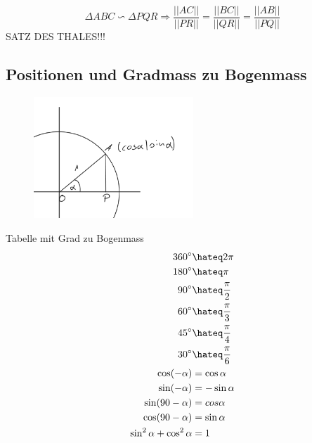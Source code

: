 \documentclass[a4paper,onecolumn,pdftex]{report}
\begin{document}
    \vspace{20px}
    $$\Delta ABC \backsim \Delta PQR \Rightarrow \frac{||AC||}{||PR||}=\frac{||BC||}{||QR||}=\frac{||AB||}{||PQ||}$$
    SATZ DES THALES!!!

    \vspace{20px}
    \subsection*{Positionen und Gradmass zu Bogenmass}
    \begin{figure}
        \includegraphics[width=6cm]{2023-10-10_21h42_30.png}
    \end{figure}
    Tabelle mit Grad zu Bogenmass
    \begin{align*}
        360^\circ &\hateq 2\pi \\
        180^\circ &\hateq \pi \\
        90^\circ &\hateq \frac{\pi}{2} \\
        60^\circ &\hateq \frac{\pi}{3} \\
        45^\circ &\hateq \frac{\pi}{4} \\
        30^\circ &\hateq \frac{\pi}{6} \\
        \cos(-\alpha) &= \cos\alpha \\
        \sin(-\alpha) &= -\sin\alpha \\
        \sin(90-\alpha) &= cos\alpha \\
        \cos(90-\alpha) &= \sin\alpha \\
        \sin^2\alpha + \cos^2\alpha &= 1
    \end{align*}

    \newpage
\end{document}
